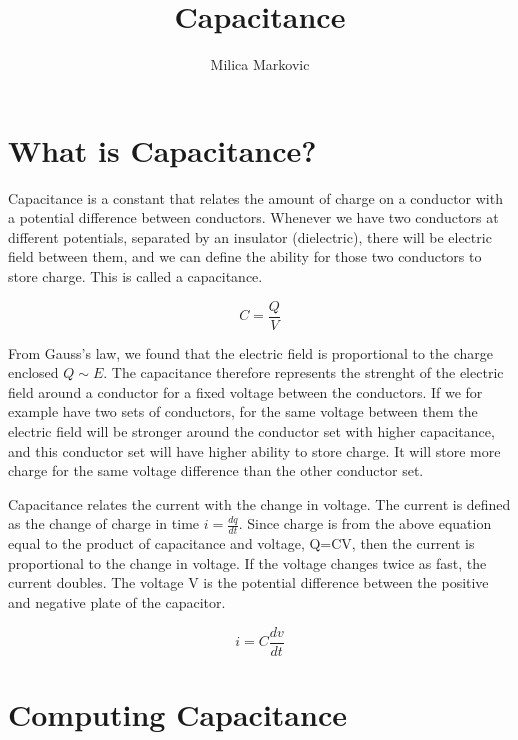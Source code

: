 \documentclass{ximera}
\title{Capacitance}
\author{Milica Markovic}
\begin{document}
  
\begin{abstract}  

\end{abstract}  
\maketitle    


\section{What is Capacitance?}
Capacitance is a constant that relates the amount of charge on a conductor with a potential difference between conductors. Whenever we have two conductors at different potentials, separated by an insulator (dielectric), there will be electric field between them, and we can define the ability for those two conductors to store charge. This is called a capacitance.

\begin{equation}
C=\frac{Q}{V}
\end{equation}

From Gauss's law, we found that the electric field is proportional to the charge enclosed $Q \sim E$. The capacitance therefore represents the strenght of the electric field around a conductor for a fixed voltage between the conductors. If we for example have two sets of conductors, for the same voltage between them the electric field will be stronger around the conductor set with higher capacitance, and this conductor set will have higher ability to store charge. It will store more charge for the same voltage difference than the other conductor set.

Capacitance relates the current with the change in voltage. The current is defined as the change of charge in time  $i=\frac{dq}{dt}$. Since charge is from the above equation equal to the product of capacitance and voltage, Q=CV, then the current is proportional to the change in voltage. If the voltage changes twice as fast, the current doubles. The voltage V is the potential  difference between the positive and negative plate of the capacitor. 

\begin{equation}
i=C \frac{dv}{dt}
\end{equation}


\section{Computing Capacitance}
\end{document}
